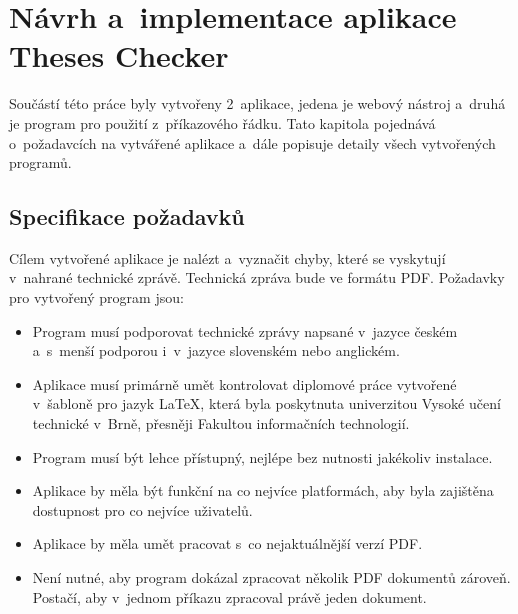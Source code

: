 



\chapter{Návrh a~implementace aplikace Theses Checker} \label{design_implementation}
Součástí této práce byly vytvořeny 2~aplikace, jedena je webový nástroj a~druhá je
program pro použití z~příkazového řádku. Tato kapitola pojednává o~požadavcích na 
vytvářené aplikace a~dále popisuje detaily všech vytvořených programů.


\section{Specifikace požadavků}
Cílem vytvořené aplikace je nalézt a~vyznačit chyby, které se vyskytují
v~nahrané technické zprávě. Technická zpráva bude ve formátu PDF.
Požadavky pro vytvořený program jsou:
\begin{itemize}
    \item Program musí podporovat technické zprávy napsané v~jazyce českém
    a~s~menší podporou i~v~jazyce slovenském nebo anglickém.

    \item Aplikace musí primárně umět kontrolovat diplomové práce vytvořené
    v~šabloně pro jazyk {\LaTeX}, která byla
    poskytnuta univerzitou Vysoké učení technické v~Brně, přesněji Fakultou
    informačních technologií.

    \item Program musí být lehce přístupný, nejlépe bez nutnosti
    jakékoliv instalace.
    
    \item Aplikace by měla být funkční na co nejvíce platformách, aby byla
    zajištěna dostupnost pro co nejvíce uživatelů.

    \item Aplikace by měla umět pracovat s~co nejaktuálnější verzí PDF.
    
    \item Není nutné, aby program dokázal zpracovat několik PDF dokumentů
    zároveň. Postačí, aby v~jednom příkazu zpracoval právě jeden dokument.
\end{itemize}

